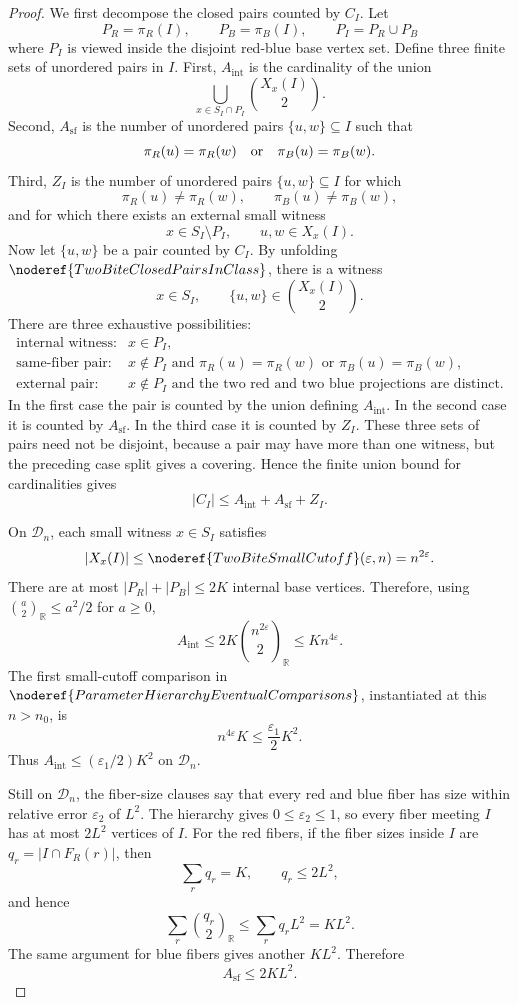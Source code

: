 \begin{proof}
We first decompose the closed pairs counted by \(C_I\).  Let
\[
P_R=\pi_R(I),\qquad P_B=\pi_B(I),\qquad P_I=P_R\cup P_B
\]
where \(P_I\) is viewed inside the disjoint red-blue base vertex set.  Define
three finite sets of unordered pairs in \(I\).  First,
\(A_{\mathrm{int}}\) is the cardinality of the union
\[
\bigcup_{x\in S_I\cap P_I}\binom{X_x(I)}2.
\]
Second, \(A_{\mathrm{sf}}\) is the number of unordered pairs
\(\{u,w\}\subseteq I\) such that
\[
\pi_R(u)=\pi_R(w)\quad\hbox{or}\quad \pi_B(u)=\pi_B(w).
\]
Third, \(Z_I\) is the number of unordered pairs \(\{u,w\}\subseteq I\) for
which
\[
\pi_R(u)\ne\pi_R(w),\qquad \pi_B(u)\ne\pi_B(w),
\]
and for which there exists an external small witness
\[
x\in S_I\setminus P_I,\qquad u,w\in X_x(I).
\]
Now let \(\{u,w\}\) be a pair counted by \(C_I\).  By unfolding
\(\noderef{TwoBiteClosedPairsInClass}\), there is a witness
\[
x\in S_I,\qquad \{u,w\}\in\binom{X_x(I)}2.
\]
There are three exhaustive possibilities:
\[
\begin{array}{ll}
\text{internal witness:} & x\in P_I,\\
\text{same-fiber pair:} & x\notin P_I\text{ and }
  \pi_R(u)=\pi_R(w)\text{ or }\pi_B(u)=\pi_B(w),\\
\text{external pair:} & x\notin P_I\text{ and the two red and two blue
  projections are distinct.}
\end{array}
\]
In the first case the pair is counted by the union defining
\(A_{\mathrm{int}}\).  In the second case it is counted by
\(A_{\mathrm{sf}}\).  In the third case it is counted by \(Z_I\).  These three
sets of pairs need not be disjoint, because a pair may have more than one
witness, but the preceding case split gives a covering.  Hence the finite
union bound for cardinalities gives
\[
|C_I|\le A_{\mathrm{int}}+A_{\mathrm{sf}}+Z_I. \tag{2}
\]

On \(\mathcal D_n\), each small witness \(x\in S_I\) satisfies
\[
|X_x(I)|\le\noderef{TwoBiteSmallCutoff}(\varepsilon,n)=n^{2\varepsilon}.
\]
There are at most \(|P_R|+|P_B|\le2K\) internal base vertices.  Therefore,
using \(\binom{a}{2}_{\mathbb R}\le a^2/2\) for \(a\ge0\),
\[
A_{\mathrm{int}}
\le 2K\binom{n^{2\varepsilon}}2_{\mathbb R}
\le K n^{4\varepsilon}. \tag{3}
\]
The first small-cutoff comparison in
\(\noderef{ParameterHierarchyEventualComparisons}\), instantiated at this
\(n>n_0\), is
\[
n^{4\varepsilon}K\le\frac{\varepsilon_1}{2}K^2. \tag{4}
\]
Thus \(A_{\mathrm{int}}\le(\varepsilon_1/2)K^2\) on \(\mathcal D_n\).

Still on \(\mathcal D_n\), the fiber-size clauses say that every red and blue
fiber has size within relative error \(\varepsilon_2\) of \(L^2\).  The
hierarchy gives \(0\le\varepsilon_2\le1\), so every fiber meeting \(I\) has at
most \(2L^2\) vertices of \(I\).  For the red fibers, if the fiber sizes inside
\(I\) are \(q_r=|I\cap F_R(r)|\), then
\[
\sum_r q_r=K,\qquad q_r\le2L^2,
\]
and hence
\[
\sum_r\binom{q_r}{2}_{\mathbb R}
\le \sum_r q_r L^2=K L^2.
\]
The same argument for blue fibers gives another \(K L^2\).  Therefore
\[
A_{\mathrm{sf}}\le2K L^2. \tag{5}
\]


\end{proof}

